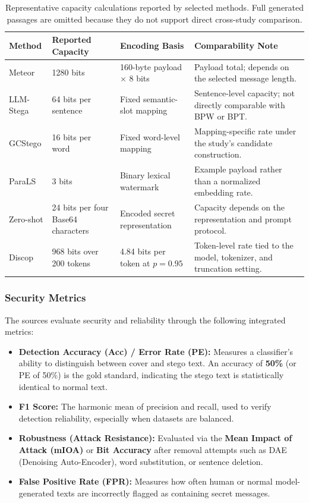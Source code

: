 \begin{table}[t]
  \centering
  \footnotesize
  \caption{Representative capacity calculations reported by selected methods. Full generated passages are omitted because they do not support direct cross-study comparison.}
  \label{tab:stego_examples}
  \begin{tabular}{p{}p{}p{}p{}}
    \hline
    \textbf{Method} & \textbf{Reported Capacity} & \textbf{Encoding Basis} & \textbf{Comparability Note} \\
    \hline
    Meteor & 1280 bits & 160-byte payload $\times$ 8 bits & Payload total; depends on the selected message length. \\
    LLM-Stega & 64 bits per sentence & Fixed semantic-slot mapping & Sentence-level capacity; not directly comparable with BPW or BPT. \\
    GCStego & 16 bits per word & Fixed word-level mapping & Mapping-specific rate under the study's candidate construction. \\
    ParaLS & 3 bits & Binary lexical watermark & Example payload rather than a normalized embedding rate. \\
    Zero-shot & 24 bits per four Base64 characters & Encoded secret representation & Capacity depends on the representation and prompt protocol. \\
    Discop & 968 bits over 200 tokens & 4.84 bits per token at $p=0.95$ & Token-level rate tied to the model, tokenizer, and truncation setting. \\
    \hline
  \end{tabular}
\end{table}


\subsubsection{Security Metrics}

The sources evaluate security and reliability through the following integrated metrics:
\begin{itemize}
  \item \textbf{Detection Accuracy (Acc) / Error Rate (PE):} Measures a classifier's ability to distinguish between cover and stego text. An accuracy of \textbf{50\%} (or PE of 50\%) is the gold standard, indicating the stego text is statistically identical to normal text.
  \item \textbf{F1 Score:} The harmonic mean of precision and recall, used to verify detection reliability, especially when datasets are balanced.
  \item \textbf{Robustness (Attack Resistance):} Evaluated via the \textbf{Mean Impact of Attack (mIOA)} or \textbf{Bit Accuracy} after removal attempts such as DAE (Denoising Auto-Encoder), word substitution, or sentence deletion.
  \item \textbf{False Positive Rate (FPR):} Measures how often human or normal model-generated texts are incorrectly flagged as containing secret messages.
\end{itemize}


